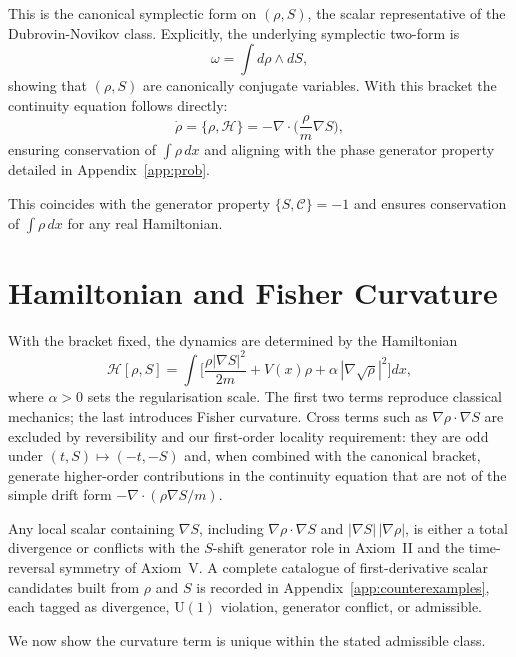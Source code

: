 \documentclass[11pt,a4paper]{article}
\numberwithin{equation}{section}
\theoremstyle{thmcompact}
\theoremstyle{remark}
\begin{document}
This is the canonical symplectic form on $(\rho,S)$, the scalar representative of the Dubrovin-Novikov class.
Explicitly, the underlying symplectic two-form is
\[
\omega=\int d\rho\wedge dS,
\]
showing that $(\rho,S)$ are canonically conjugate variables.
With this bracket the continuity equation follows directly:
\[
\dot\rho=\{\rho,\mathcal H\}
=-\nabla\!\cdot\!\Big(\frac{\rho}{m}\nabla S\Big),
\]
ensuring conservation of $\int\rho\,dx$ and aligning with the phase generator property detailed in Appendix~\ref{app:prob}.

This coincides with the generator property $\{S,\mathcal C\}=-1$ and ensures conservation of $\int\rho\,dx$ for any real Hamiltonian.
	
\section{Hamiltonian and Fisher Curvature}

With the bracket fixed, the dynamics are determined by the Hamiltonian
\begin{equation}
	\mathcal H[\rho,S]=
	\int\!\!\Big[
	\frac{\rho|\nabla S|^2}{2m}
	+V(x)\rho
	+\alpha\,|\nabla\sqrt\rho|^2
	\Big]dx,
\label{eq:H}
\end{equation}
where $\alpha>0$ sets the regularisation scale.
The first two terms reproduce classical mechanics; the last introduces Fisher curvature.
Cross terms such as $\nabla \rho \!\cdot\! \nabla S$ are excluded by reversibility and our first-order locality requirement: they are odd under $(t,S)\mapsto(-t,-S)$ and, when combined with the canonical bracket, generate higher-order contributions in the continuity equation that are not of the simple drift form $-\nabla\!\cdot(\rho\nabla S/m)$.

Any local scalar containing $\nabla S$, including $\nabla\rho\!\cdot\!\nabla S$ and $|\nabla S|\,|\nabla\rho|$, is either a total divergence or conflicts with the $S$-shift generator role in Axiom~II and the time-reversal symmetry of Axiom~V.
A complete catalogue of first-derivative scalar candidates built from $\rho$ and $S$ is recorded in Appendix~\ref{app:counterexamples}, each tagged as divergence, $\mathrm{U}(1)
$ violation, generator conflict, or admissible.

We now show the curvature term is unique within the stated admissible class.
	
\end{document}

